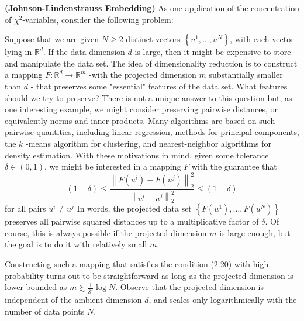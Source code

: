 \documentclass{article}
\newcommand{\bfs}[1]{\textbf{({#1})}}
\begin{document}
\begin{exma}{\bfs{Johnson-Lindenstrauss Embedding}}
     As one application of the concentration of $\chi^{2}$-variables, consider the following problem:
     
     Suppose that we are given $N \geq 2$ distinct vectors $\left\{u^{1}, \ldots, u^{N}\right\}$, with each vector lying in $\mathbb{R}^{d}$. If the data dimension $d$ is large, then it might be expensive to store and manipulate the data set. The idea of dimensionality reduction is to construct a mapping $F: \mathbb{R}^{d} \rightarrow \mathbb{R}^{m}$ -with the projected dimension $m$ substantially smaller than $d$ - that preserves some "essential" features of the data set. What features should we try to preserve? There is not a unique answer to this question but, as one interesting example, we might consider preserving pairwise distances, or equivalently norms
     and inner products. Many algorithms are based on such pairwise quantities, including linear regression, methods for principal components, the $k$ -means algorithm for clustering, and nearest-neighbor algorithms for density estimation. With these motivations in mind, given some tolerance $\delta \in(0,1)$, we might be interested in a mapping $F$ with the guarantee that
$$
(1-\delta) \leq \frac{\left\|F\left(u^{i}\right)-F\left(u^{j}\right)\right\|_{2}^{2}}{\left\|u^{i}-u^{j}\right\|_{2}^{2}} \leq(1+\delta)
$$
for all pairs $u^{i} \neq u^{j}$
In words, the projected data set $\left\{F\left(u^{1}\right), \ldots, F\left(u^{N}\right)\right\}$ preserves all pairwise squared distances up to a multiplicative factor of $\delta$. Of course, this is always possible if the projected dimension $m$ is large enough, but the goal is to do it with relatively small $m .$

Constructing such a mapping that satisfies the condition (2.20) with high probability turns out to be straightforward as long as the projected dimension is lower bounded as $m \succsim \frac{1}{\delta^{2}} \log N$. Observe that the projected dimension is independent of the ambient dimension $d$, and scales only logarithmically with the number of data points $N$.



\end{exma}
\end{document}
